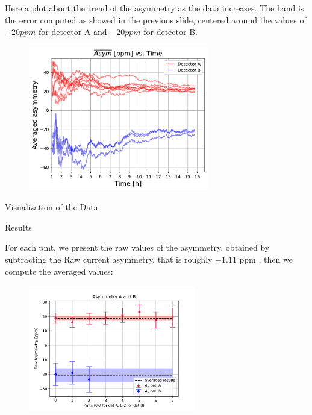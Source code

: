 \documentclass[9pt,a4paper]{beamer}
\begin{document}
\begin{frame}

Here a plot about the trend of the asymmetry as the data increases. The band is the error computed as showed in the previous slide, centered around the values of $+20ppm$ for detector A and $-20ppm$ for detector B.

\begin{figure}[hbtp]
\centering
\includegraphics[width = 0.70\textwidth]{figures/AveragedAsymmetry.pdf}
\end{figure}

\end{frame}


\begin{frame}{Visualization of the Data}

\end{frame}

\begin{frame}{Results}

For each pmt, we present the raw values of the asymmetry, obtained by subtracting the Raw current asymmetry, that is roughly $-1.11$ ppm , then we compute the averaged values:

\begin{figure}[hbtp]
\centering
\includegraphics[width = 0.65\textwidth]{figures/FirstResult.pdf}
\end{figure}
\end{frame}
\end{document}
